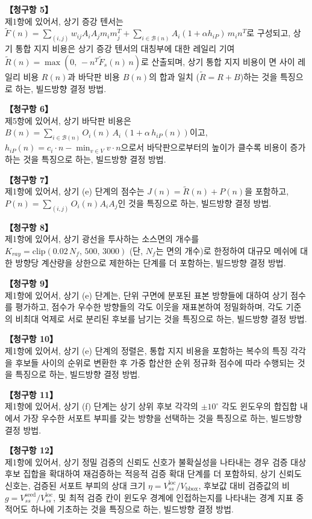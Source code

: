 \documentclass[11pt,a4paper]{article}
\begin{document}
\medskip
\textbf{【청구항 5】}\\
제1항에 있어서, 상기 증강 텐서는
$\tilde F(n)=\sum_{(i,j)} w_{ij}A_iA_jm_im_j^{T}+\sum_{i\in\mathcal{B}(n)}
A_i(1+\alpha h_{iP})\,m_in^{T}$로 구성되고, 상기 통합 지지 비용은 상기 증강 텐서의
대칭부에 대한 레일리 기여 $\tilde R(n)=\max(0,\,-n^{T}\tilde F_s(n)\,n)$로 산출되며,
상기 통합 지지 비용이 면 사이 레일리 비용 $R(n)$과 바닥판 비용 $B(n)$의 합과 일치
($\tilde R=R+B$)하는 것을 특징으로 하는, 빌드방향 결정 방법.

\medskip
\textbf{【청구항 6】}\\
제5항에 있어서, 상기 바닥판 비용은
$B(n)=\sum_{i\in\mathcal{B}(n)} O_i(n)\,A_i\,(1+\alpha\,h_{iP}(n))$이고,
$h_{iP}(n)=c_i\cdot n-\min_{v\in V} v\cdot n$으로서 바닥판으로부터의 높이가 클수록
비용이 증가하는 것을 특징으로 하는, 빌드방향 결정 방법.

\medskip
\textbf{【청구항 7】}\\
제1항에 있어서, 상기 (e) 단계의 점수는 $J(n)=\tilde R(n)+P(n)$을 포함하고,
$P(n)=\sum_{(i,j)}O_i(n)A_iA_j$인 것을 특징으로 하는, 빌드방향 결정 방법.

\medskip
\textbf{【청구항 8】}\\
제1항에 있어서, 상기 광선을 투사하는 소스면의 개수를
$K_{ray}=\mathrm{clip}(0.02\,N_f,\,500,\,3000)$ (단, $N_f$는 면의 개수)로 한정하여
대규모 메쉬에 대한 방향당 계산량을 상한으로 제한하는 단계를 더 포함하는, 빌드방향
결정 방법.

\medskip
\textbf{【청구항 9】}\\
제1항에 있어서, 상기 (e) 단계는, 단위 구면에 분포된 표본 방향들에 대하여 상기 점수를
평가하고, 점수가 우수한 방향들의 각도 이웃을 재표본하여 정밀화하며, 각도 기준의
비최대 억제로 서로 분리된 후보를 남기는 것을 특징으로 하는, 빌드방향 결정 방법.

\medskip
\textbf{【청구항 10】}\\
제1항에 있어서, 상기 (e) 단계의 정렬은, 통합 지지 비용을 포함하는 복수의 특징
각각을 후보들 사이의 순위로 변환한 후 가중 합산한 순위 정규화 점수에 따라 수행되는
것을 특징으로 하는, 빌드방향 결정 방법.

\medskip
\textbf{【청구항 11】}\\
제1항에 있어서, 상기 (f) 단계는 상기 상위 후보 각각의 $\pm10^\circ$ 각도 윈도우의
합집합 내에서 가장 우수한 서포트 부피를 갖는 방향을 선택하는 것을 특징으로 하는,
빌드방향 결정 방법.

\medskip
\textbf{【청구항 12】}\\
제1항에 있어서, 상기 정밀 검증의 신뢰도 신호가 불확실성을 나타내는 경우 검증 대상
후보 집합을 확대하여 재검증하는 적응적 검증 확대 단계를 더 포함하되, 상기 신뢰도
신호는, 검증된 서포트 부피의 상대 크기 $\eta=V_{ss}^{\mathrm{loc}}/V_{\mathrm{bbox}}$,
후보값 대비 검증값의 비 $g=V_{ss}^{\mathrm{seed}}/V_{ss}^{\mathrm{loc}}$, 및 최적
검증 칸이 윈도우 경계에 인접하는지를 나타내는 경계 지표 중 적어도 하나에 기초하는
것을 특징으로 하는, 빌드방향 결정 방법.
\end{document}
